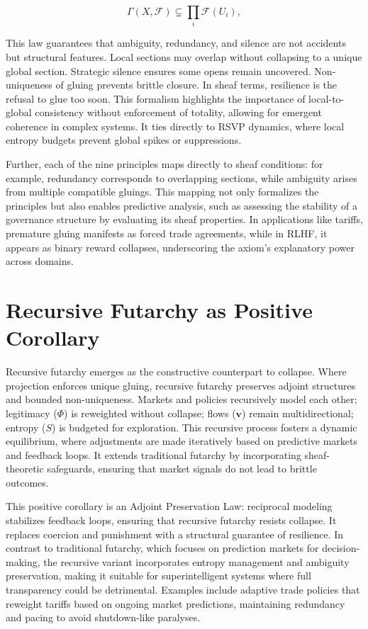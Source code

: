 \documentclass{article}
\begin{document}
\[\Gamma(X,\mathcal{F}) \subsetneq \prod_{i} \mathcal{F}(U_i),\]

This law guarantees that ambiguity, redundancy, and silence are not accidents but structural features. Local sections may overlap without collapsing to a unique global section. Strategic silence ensures some opens remain uncovered. Non-uniqueness of gluing prevents brittle closure. In sheaf terms, resilience is the refusal to glue too soon. This formalism highlights the importance of local-to-global consistency without enforcement of totality, allowing for emergent coherence in complex systems. It ties directly to RSVP dynamics, where local entropy budgets prevent global spikes or suppressions.

Further, each of the nine principles maps directly to sheaf conditions: for example, redundancy corresponds to overlapping sections, while ambiguity arises from multiple compatible gluings. This mapping not only formalizes the principles but also enables predictive analysis, such as assessing the stability of a governance structure by evaluating its sheaf properties. In applications like tariffs, premature gluing manifests as forced trade agreements, while in RLHF, it appears as binary reward collapses, underscoring the axiom's explanatory power across domains.

\section{Recursive Futarchy as Positive Corollary}

Recursive futarchy emerges as the constructive counterpart to collapse. Where projection enforces unique gluing, recursive futarchy preserves adjoint structures and bounded non-uniqueness. Markets and policies recursively model each other; legitimacy ($\Phi$) is reweighted without collapse; flows ($\mathbf{v}$) remain multidirectional; entropy ($S$) is budgeted for exploration. This recursive process fosters a dynamic equilibrium, where adjustments are made iteratively based on predictive markets and feedback loops. It extends traditional futarchy by incorporating sheaf-theoretic safeguards, ensuring that market signals do not lead to brittle outcomes.

This positive corollary is an Adjoint Preservation Law: reciprocal modeling stabilizes feedback loops, ensuring that recursive futarchy resists collapse. It replaces coercion and punishment with a structural guarantee of resilience. In contrast to traditional futarchy, which focuses on prediction markets for decision-making, the recursive variant incorporates entropy management and ambiguity preservation, making it suitable for superintelligent systems where full transparency could be detrimental. Examples include adaptive trade policies that reweight tariffs based on ongoing market predictions, maintaining redundancy and pacing to avoid shutdown-like paralyses.
\end{document}
